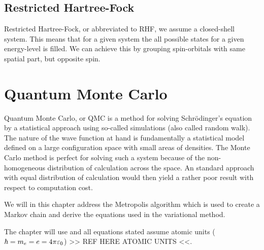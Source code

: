     \subsection{Restricted Hartree-Fock}
        Restricted Hartree-Fock, or abbreviated to RHF, we assume a
        closed-shell system. This means that for a given system the all
        possible states for a given energy-level is filled. We can achieve this
        by grouping spin-orbitals with same spatial part, but opposite spin.

\section{Quantum Monte Carlo\label{sec:QMC}}
    Quantum Monte Carlo, or QMC is a method for solving Schrödinger's equation
    by a statistical approach using so-called  simulations
    (also called random walk). The nature of the wave function at hand is
    fundamentally a statistical model defined on a large configuration space
    with small areas of densities. The Monte Carlo method is perfect for
    solving such a system because of the non-homogeneous distribution of
    calculation across the space. An standard approach with equal distribution
    of calculation would then yield a rather poor result with respect to
    computation cost.

    We will in this chapter address the Metropolis algorithm which is used to
    create a Markov chain and derive the equations used in the variational
    method.

    The chapter will use  \cite{GriffQuan} and all
    equations stated assume atomic units ($\hbar=m_e=e=4\pi\varepsilon_0$) >> REF
    HERE ATOMIC UNITS <<.

